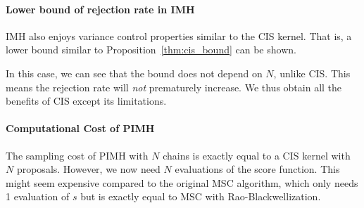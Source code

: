 \paragraph{Lower bound of rejection rate in IMH}
IMH also enjoys variance control properties similar to the CIS kernel.
That is, a lower bound similar to Proposition~\eqref{thm:cis_bound} can be shown.
%

%
In this case, we can see that the bound does not depend on \(N\), unlike CIS.
This means the rejection rate will \textit{not} prematurely increase.
We thus obtain all the benefits of CIS except its limitations.

\paragraph{Computational Cost of PIMH}
The sampling cost of PIMH with \(N\) chains is exactly equal to a CIS kernel with \(N\) proposals.
However, we now need \(N\) evaluations of the score function.
This might seem expensive compared to the original MSC algorithm, which only needs 1 evaluation of \(s\) but is exactly equal to MSC with Rao-Blackwellization.

